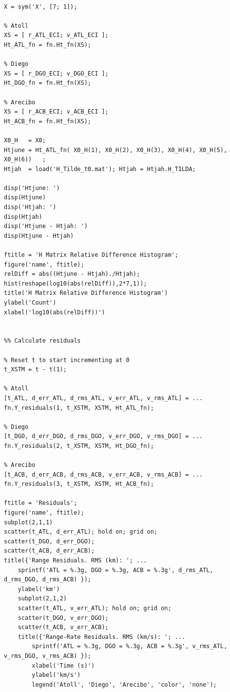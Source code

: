 \documentclass[conf]{new-aiaa}
\begin{document}
\begin{lstlisting}[basicstyle=\footnotesize]
%% DO EVERYTHING IN ECI FRAME 

X = sym('X', [7; 1]); 

% Atoll 
XS = [ r_ATL_ECI; v_ATL_ECI ]; 
Ht_ATL_fn = fn.Ht_fn(XS); 

% Diego 
XS = [ r_DGO_ECI; v_DGO_ECI ]; 
Ht_DGO_fn = fn.Ht_fn(XS); 

% Arecibo 
XS = [ r_ACB_ECI; v_ACB_ECI ]; 
Ht_ACB_fn = fn.Ht_fn(XS); 

X0_H   = X0; 
Htjune = Ht_ATL_fn( X0_H(1), X0_H(2), X0_H(3), X0_H(4), X0_H(5), X0_H(6))   ; 
Htjah  = load('H_Tilde_t0.mat'); Htjah = Htjah.H_TILDA; 

disp('Htjune: ')
disp(Htjune)
disp('Htjah: ') 
disp(Htjah)
disp('Htjune - Htjah: ')
disp(Htjune - Htjah)

ftitle = 'H Matrix Relative Difference Histogram'; 
figure('name', ftitle); 
relDiff = abs((Htjune - Htjah)./Htjah); 
hist(reshape(log10(abs(relDiff)),2*7,1)); 
title('H Matrix Relative Difference Histogram') 
ylabel('Count') 
xlabel('log10(abs(relDiff))') 


%% Calculate residuals 

% Reset t to start incrementing at 0 
t_XSTM = t - t(1); 

% Atoll 
[t_ATL, d_err_ATL, d_rms_ATL, v_err_ATL, v_rms_ATL] = ... 
fn.Y_residuals(1, t_XSTM, XSTM, Ht_ATL_fn); 

% Diego 
[t_DGO, d_err_DGO, d_rms_DGO, v_err_DGO, v_rms_DGO] = ... 
fn.Y_residuals(2, t_XSTM, XSTM, Ht_DGO_fn); 

% Arecibo 
[t_ACB, d_err_ACB, d_rms_ACB, v_err_ACB, v_rms_ACB] = ... 
fn.Y_residuals(3, t_XSTM, XSTM, Ht_ACB_fn); 

ftitle = 'Residuals'; 
figure('name', ftitle); 
subplot(2,1,1) 
scatter(t_ATL, d_err_ATL); hold on; grid on; 
scatter(t_DGO, d_err_DGO); 
scatter(t_ACB, d_err_ACB); 
title({'Range Residuals. RMS (km): '; ... 
	sprintf('ATL = %.3g, DGO = %.3g, ACB = %.3g', d_rms_ATL, d_rms_DGO, d_rms_ACB) }); 
	ylabel('km')  
	subplot(2,1,2) 
	scatter(t_ATL, v_err_ATL); hold on; grid on; 
	scatter(t_DGO, v_err_DGO); 
	scatter(t_ACB, v_err_ACB); 
	title({'Range-Rate Residuals. RMS (km/s): '; ... 
		sprintf('ATL = %.3g, DGO = %.3g, ACB = %.3g', v_rms_ATL, v_rms_DGO, v_rms_ACB) }); 
		xlabel('Time (s)') 
		ylabel('km/s') 
		legend('Atoll', 'Diego', 'Arecibo', 'color', 'none');
\end{lstlisting}
\end{document}
